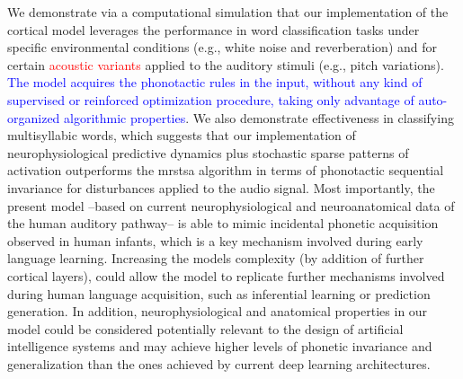 \documentclass[10pt,letterpaper]{article}
\begin{document}
We demonstrate via a computational simulation that our implementation of the cortical model leverages the performance in word classification tasks under specific environmental conditions (e.g., white noise and reverberation) and for certain \textcolor{red}{acoustic variants} applied to the auditory stimuli (e.g., pitch variations). \textcolor{blue}{The model acquires the phonotactic rules in the input, without any kind of supervised or reinforced optimization procedure, taking only advantage of auto-organized algorithmic properties}. We also demonstrate effectiveness in classifying multisyllabic words, which suggests that our implementation of neurophysiological predictive dynamics plus stochastic sparse patterns of activation outperforms the \gls{mrstsa} algorithm in terms of phonotactic sequential invariance for disturbances applied to the audio signal. Most importantly, the present model --based on current neurophysiological and neuroanatomical data of the human auditory pathway-- is able to mimic incidental phonetic acquisition observed in human infants, which is a key mechanism involved during early language learning. Increasing the models complexity (by addition of further cortical layers), could allow the model to replicate further mechanisms involved during human language acquisition, such as inferential learning or prediction generation. In addition, neurophysiological and anatomical properties in our model could be considered potentially relevant to the design of artificial intelligence systems and may achieve higher levels of phonetic invariance and generalization than the ones achieved by current deep learning architectures.


\end{document}
